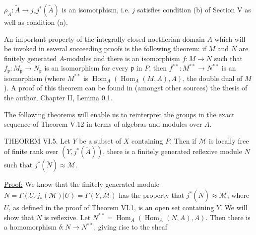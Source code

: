 
$\rho_{\widetilde A}:\widetilde A\longrightarrow j_*j^*(\widetilde A)$ is an isomorphism, i.e. $j$ satisfies condition (b) of Section V as well as condition (a).

An important property of the integrally closed noetherian domain $A$ which will be invoked in several succeeding proofs is the following theorem: if $M$ and $N$ are finitely generated $A$-modules and there is an isomorphism $f:M\longrightarrow N$ such that $f_{\mathfrak p}:M_{\mathfrak p}\longrightarrow N_{\mathfrak p}$ is an isomorphism for every $\mathfrak p$ in $P$, then $f^{**}:M^{**}\longrightarrow N^{**}$ is an isomorphism (where $M^{**}$ is $\operatorname{Hom}_A(\operatorname{Hom}_A(M,A),A)$, the double dual of $M$). A proof of this theorem can be found in (amongst other sources) the thesis of the author, Chapter II, Lemma 0.1.

The following theorems will enable us to reinterpret the groups in the exact sequence of Theorem V.12 in terms of algebras and modules over $A$.

THEOREM VI.5. Let $Y$ be a subset of $X$ containing $P$. Then if $\mathcal M$ is locally free of finite rank over $(Y,j^*(\widetilde A))$, there is a finitely generated reflexive module $N$ such that $j^*(\widetilde N)\approx\mathcal M$.

\uline{Proof:} We know that the finitely generated module $N=\Gamma(U,j_*(\mathcal M)|U)=\Gamma(Y,\mathcal M)$ has the property that $j^*(\widetilde N)\approx\mathcal M$, where $U$, as defined in the proof of Theorem VI.1, is an open set containing $Y$. We will show that $N$ is reflexive. Let $N^{**}=\operatorname{Hom}_A(\operatorname{Hom}_A(N,A),A)$. Then there is a homomorphism $\delta:N\longrightarrow N^{**}$, giving rise to the sheaf


